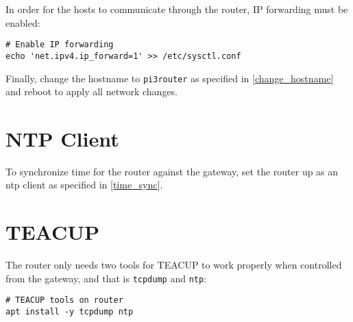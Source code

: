 In order for the hosts to communicate through the router, IP forwarding must be enabled:

\begin{verbatim}
# Enable IP forwarding
echo 'net.ipv4.ip_forward=1' >> /etc/sysctl.conf
\end{verbatim}

Finally, change the hostname to \lstinline{pi3router} as specified in \ref{change_hostname} and reboot to apply all network changes.


\section{NTP Client}

To synchronize time for the router against the gateway, set the router up as an \gls{ntp} client as specified in \ref{time_sync}.


\section{TEACUP}

The router only needs two tools for TEACUP to work properly when controlled from the gateway, and that is \lstinline{tcpdump} and \lstinline{ntp}:

\begin{verbatim}
# TEACUP tools on router
apt install -y tcpdump ntp
\end{verbatim}